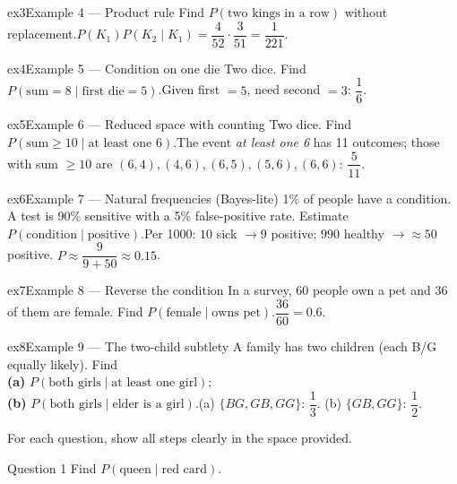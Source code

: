 \documentclass[11pt]{article}
\begin{document}
\begin{example}{ex3}{Example 4 --- Product rule}
Find $P(\text{two kings in a row})$ without replacement.\soln $P(K_1)P(K_2\mid K_1)=\dfrac{4}{52}\cdot\dfrac{3}{51}=\dfrac{1}{221}$.
\end{example}

\begin{example}{ex4}{Example 5 --- Condition on one die}
Two dice. Find $P(\text{sum}=8\mid\text{first die}=5)$.\soln Given first $=5$, need second $=3$: $\dfrac16$.
\end{example}

\begin{example}{ex5}{Example 6 --- Reduced space with counting}
Two dice. Find $P(\text{sum}\ge10\mid\text{at least one 6})$.\soln The event \emph{at least one 6} has 11 outcomes; those with sum $\ge10$ are $(6,4),(4,6),(6,5),(5,6),(6,6)$: $\dfrac{5}{11}$.
\end{example}

\begin{example}{ex6}{Example 7 --- Natural frequencies (Bayes-lite)}
1\% of people have a condition. A test is 90\% sensitive with a 5\% false-positive rate. Estimate $P(\text{condition}\mid\text{positive})$.\soln Per 1000: $10$ sick $\to9$ positive; $990$ healthy $\to\approx50$ positive. $P\approx\dfrac{9}{9+50}\approx0.15$.
\end{example}

\begin{example}{ex7}{Example 8 --- Reverse the condition}
In a survey, 60 people own a pet and 36 of them are female. Find $P(\text{female}\mid\text{owns pet})$.\soln $\dfrac{36}{60}=0.6$.
\end{example}

\begin{example}{ex8}{Example 9 --- The two-child subtlety}
A family has two children (each B/G equally likely). Find \\ \textbf{(a)} $P(\text{both girls}\mid\text{at least one girl})$; \\ \textbf{(b)} $P(\text{both girls}\mid\text{elder is a girl})$.\soln (a) $\{BG,GB,GG\}$: $\dfrac13$. (b) $\{GB,GG\}$: $\dfrac12$.
\end{example}

\clearpage
{}
For each question, show all steps clearly in the space provided.

\begin{qbox}{Question 1}
Find $P(\text{queen}\mid\text{red card})$.\workspace{2.4cm}
\end{qbox}
\end{document}
